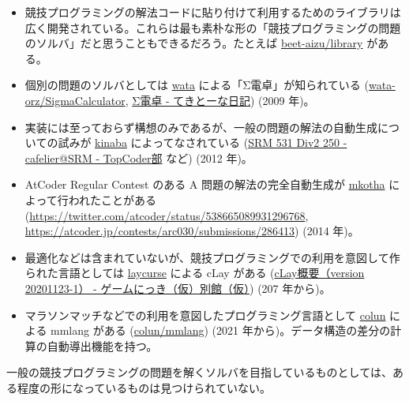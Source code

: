 \documentclass{ltjsarticle}
\begin{document}
\begin{itemize}
    \item 競技プログラミングの解法コードに貼り付けて利用するためのライブラリは広く開発されている。これらは最も素朴な形の「競技プログラミングの問題のソルバ」だと思うこともできるだろう。たとえば \href{https://github.com/beet-aizu/library}{beet-aizu/library} がある。
    \item 個別の問題のソルバとしては \href{https://atcoder.jp/users/wata}{wata} による「Σ電卓」が知られている (\href{https://github.com/wata-orz/SigmaCalculator}{wata-orz/SigmaCalculator}, \href{https://wata-orz.hatenadiary.org/entry/20091223/1261582436}{Σ電卓 - てきとーな日記}) (2009 年)。
    \item 実装には至っておらず構想のみであるが、一般の問題の解法の自動生成についての試みが \href{https://www.topcoder.com/members/cafelier/}{kinaba} によってなされている (\href{https://topcoder-g-hatena-ne-jp.jag-icpc.org/cafelier/20120204/1328332594.html}{SRM 531 Div2 250 - cafelier@SRM - TopCoder部} など) (2012 年)。
    \item AtCoder Regular Contest のある A 問題の解法の完全自動生成が \href{https://atcoder.jp/users/mkotha}{mkotha} によって行われたことがある (\url{https://twitter.com/atcoder/status/538665089931296768}, \url{https://atcoder.jp/contests/arc030/submissions/286413}) (2014 年)。
    \item 最適化などは含まれていないが、競技プログラミングでの利用を意図して作られた言語としては \href{https://atcoder.jp/users/LayCurse}{laycurse} による cLay がある (\href{http://rsujskf.s602.xrea.com/?cLay}{cLay概要（version 20201123-1） - ゲームにっき（仮）別館（仮）}) (207 年から)。
    \item マラソンマッチなどでの利用を意図したプログラミング言語として \href{https://atcoder.jp/users/colun}{colun} による mmlang がある (\href{https://github.com/colun/mmlang}{colun/mmlang}) (2021 年から)。データ構造の差分の計算の自動導出機能を持つ。
\end{itemize}

一般の競技プログラミングの問題を解くソルバを目指しているものとしては、ある程度の形になっているものは見つけられていない。


% 
% 
\end{document}
